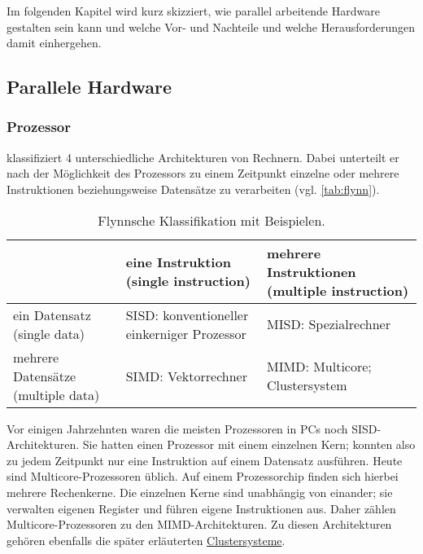     Im folgenden Kapitel wird kurz skizziert, wie parallel arbeitende Hardware gestalten sein kann und welche Vor- und Nachteile und welche Herausforderungen damit einhergehen.
    
    \subsection{Parallele Hardware}
    \label{sec:parhard}
      \subsubsection{Prozessor}
      \label{sec:processor}
      \citet{flynn} klassifiziert 4 unterschiedliche Architekturen von Rechnern. Dabei unterteilt er nach der Möglichkeit des Prozessors zu einem Zeitpunkt einzelne oder mehrere
      Instruktionen beziehungsweise Datensätze zu verarbeiten (vgl. \autoref{tab:flynn}).
      \begin{table}[tb]
	\centering
	\begin{tabular}{|p{3.5cm}|p{4cm}|p{4cm}|}
	  \hline
			                             & eine Instruktion \newline (single instruction)       & mehrere Instruktionen \newline (multiple instruction) \\
	  \hline
	  ein Datensatz \newline (single data)       & SISD: konventioneller \newline einkerniger Prozessor & MISD: Spezialrechner                                  \\
	  \hline
	  mehrere Datensätze \newline (multiple data)& SIMD: Vektorrechner                                  & MIMD: Multicore; \newline Clustersystem               \\
	  \hline
	\end{tabular}
	\caption{Flynnsche Klassifikation mit Beispielen.}
	\label{tab:flynn}
      \end{table}
      
      Vor einigen Jahrzehnten waren die meisten Prozessoren in PCs noch SISD-Architekturen. Sie hatten einen Prozessor mit einem einzelnen Kern; konnten also zu jedem Zeitpunkt nur eine Instruktion
      auf einem Datensatz ausführen. Heute sind Multicore-Prozessoren üblich. Auf einem Prozessorchip finden sich hierbei mehrere Rechenkerne. Die einzelnen Kerne sind unabhängig von einander; sie 
      verwalten eigenen Register und führen eigene Instruktionen aus. Daher zählen Multicore-Prozessoren zu den MIMD-Architekturen. Zu diesen Architekturen gehören ebenfalls die später erläuterten 
      \hyperref[sec:netzwerk]{Clustersysteme}. \citep{flynn, multicore}
      
